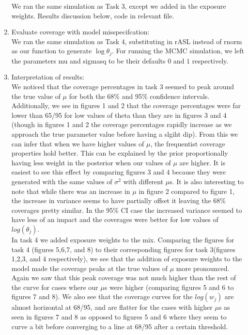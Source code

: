 \documentclass[paper=a4, fontsize=11pt]{scrartcl}
\begin{document}
\begin{enumerate}
      We ran the same simulation as Task 3, except we added in the exposure weights. Results discussion below, code in relevant file.
    \item Evaluate coverage with model misspecifcation: \\
      We ran the same simulation as Task 4, substituting in rASL instead of rnorm as our function to generate $\log{\theta_j}$. For running the MCMC simulation, we left the parameters mu and sigmasq to be their defaults $0$ and $1$ respectively.
	\item Interpretation of results:\\
	We noticed that the coverage percentages in task 3 seemed to peak around the true value of $\mu$ for both the 68\% and 95\% confidence intervals. Additionally, we see in figures 1 and 2 that the coverage percentages were far lower than 65/95 for low values of theta than they are in figures 3 and 4 (though in figures 1 and 2 the coverage percentages rapidly increase as we approach the true parameter value before having a slgiht dip). From this we can infer that when we have higher values of $\mu$, the frequentist coverage properties hold better. This can be explained by the prior proportionally having less weight in the posterior when our values of $\mu$ are higher. It is easiest to see this effect by comparing figures 3 and 4 because they were generated with the same values of $\sigma^2$ with different $\mu$s. It is also interesting to note that while there was an increase in $\mu$ in figure 2 compared to figure 1, the increase in variance seems to have partially offset it leaving the 68\% coverages pretty similar. In the 95\% CI case the increased variance seemed to have less of an impact and the coverages were better for low values of $log(\theta_{j})$.\\
	In task 4 we added exposure weights to the mix. Comparing the figures for task 4 (figures 5,6,7, and 8) to their corresponding figures for task 3(figures 1,2,3, and 4 respectively), we see that the addition of exposure weights to the model made the coverage peaks at the true values of $\mu$ more pronounced. Again we saw that this peak coverage was not much higher than the rest of the curve for cases where our $\mu$s were higher (comparing figures 5 and 6 to figures 7 and 8). We also see that the coverage curves for the $log(w_j)$ are almost horizontal at 68/95, and are flatter for the cases with higher $\mu$s as seen in figures 7 and 8 as opposed to figures 5 and 6 where they seem to curve a bit before converging to a line at 68/95 after a certain threshold.\\

\end{enumerate}
\end{document}
